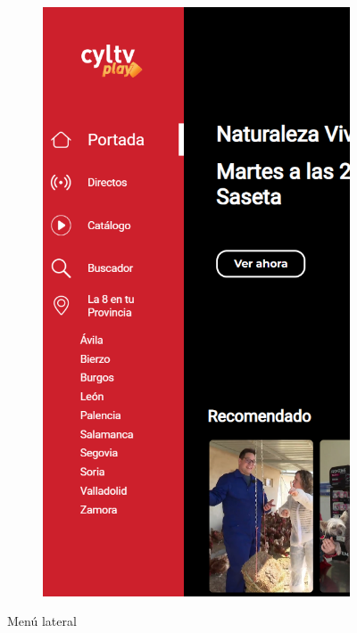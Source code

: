 \begin{figure}[H]
\begin{subfigure}[c]{0.1\textwidth}
        \label{fig:menu_lateral_cerrado}
    \end{subfigure}
    \hspace{0.05\textwidth}
    \begin{subfigure}[c]{0.1\textwidth}
        \includegraphics[width=\textwidth]{imaxes/OTT/menu_lateral_abierto.png}
        \label{fig:menu_lateral_abierto}
    \end{subfigure}
    \caption{Menú lateral}
\end{figure}

